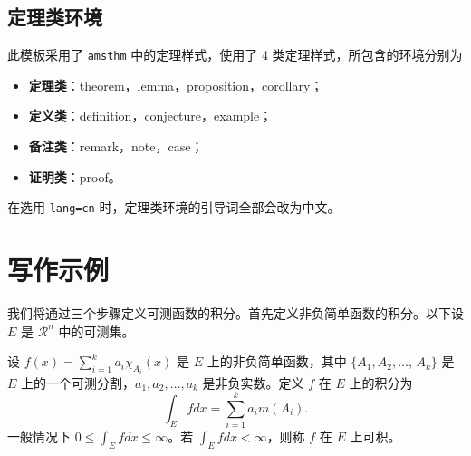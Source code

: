 \documentclass[cn,pad,11pt,green,geye]{../elegantnote}
\begin{document}
\subsection{定理类环境}
此模板采用了 \lstinline{amsthm} 中的定理样式，使用了 4 类定理样式，所包含的环境分别为
\begin{itemize}
\item \textbf{定理类}：theorem，lemma，proposition，corollary；
\item \textbf{定义类}：definition，conjecture，example；
\item \textbf{备注类}：remark，note，case；
\item \textbf{证明类}：proof。
\end{itemize}

\begin{remark}
在选用 \lstinline{lang=cn} 时，定理类环境的引导词全部会改为中文。
\end{remark}

\section{写作示例}

我们将通过三个步骤定义可测函数的积分。首先定义非负简单函数的积分。以下设 $E$ 是 $\mathcal{R}^n$ 中的可测集。

\begin{definition}[可积性]
设 $ f(x)=\sum\limits_{i=1}^{k} a_i \chi_{A_i}(x)$ 是 $E$ 上的非负简单函数，其中 $\{A_1,A_2,\ldots$, $A_k\}$ 是 $E$ 上的一个可测分割，$a_1,a_2,\ldots,a_k$ 是非负实数。定义 $f$ 在 $E$ 上的积分为
\begin{equation}
   \label{inter}
   \int_{E} f dx = \sum_{i=1}^k a_i m(A_i).
\end{equation}
一般情况下 $0 \leq \int_{E} f dx \leq \infty$。若 $\int_{E} f dx < \infty$，则称 $f$ 在 $E$ 上可积。
\end{definition}
\end{document}
